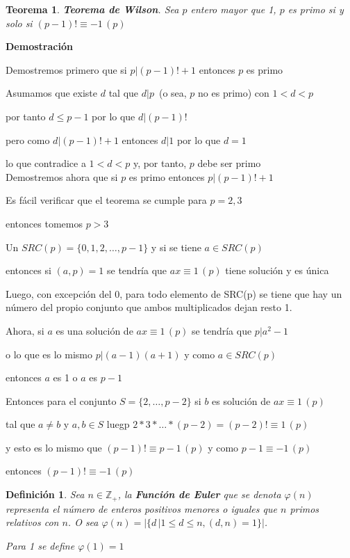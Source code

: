 \documentclass[a4paper,12pt]{report}
\newtheorem*{teo}{Teorema}
\newtheorem*{dfn}{Definición}
\begin{document}
 
 
 \begin{teo}
  \textbf{Teorema de Wilson}. Sea $p$ entero mayor que 1, $p$ es primo si y solo si $(p-1)!\equiv -1\, (p)$
 \end{teo}
 
 \textbf{Demostración}
 
 Demostremos primero que si $p|(p-1)! + 1$ entonces $p$ es primo
 
 Asumamos que existe $d$ tal que $d|p$~(o sea, $p$ no es primo) con $1<d<p$
 
 por tanto $d\leq p-1$ por lo que $d|(p-1)!$
 
 pero como $d|(p-1)!+1$ entonces $d|1$ por lo que $d=1$ 
 
 lo que contradice a $1<d<p$ y, por tanto, $p$ debe ser primo\\
 
 Demostremos ahora que si $p$ es primo entonces $p|(p-1)! + 1$
 
 Es fácil verificar que el teorema se cumple para $p=2,3$ 
 
 entonces tomemos $p>3$
 
 Un $SRC(p)=\{0,1,2,\dots,p-1\}$ y si se tiene $a\in SRC(p)$ 
 
 entonces si $(a,p)=1$  se tendría que $ax\equiv 1\, (p)$ tiene solución y es única
 
 Luego, con excepción del 0, para todo elemento de SRC(p) se tiene que hay un número del propio 
 conjunto que ambos multiplicados dejan resto 1.
 
 Ahora, si $a$ es una solución de $ax\equiv 1\, (p)$ se tendría que $p|a^2-1$ 
 
 o lo que es lo mismo $p|(a-1)(a+1)$ y como $a\in SRC(p)$  
 
 entonces $a$ es 1 o $a$ es $p-1$
 
 Entonces para el conjunto $S=\{2,\dots,p-2\}$ si $b$ es solución de $ax\equiv 1\, (p)$
 
 tal que $a\neq b$ y $a,b\in S$ luegp $2*3*\dots * (p-2)=(p-2)!\equiv 1 \, (p)$
 
 y esto es lo mismo que $(p-1)!\equiv p-1 \, (p)$ y como $p-1\equiv -1 \, (p)$
 
 entonces $(p-1)!\equiv -1 \, (p)$
 
 \begin{dfn}
  Sea $n\in \mathbb{Z}_+$, la \textbf{Función de Euler} que se denota $\varphi(n)$ representa el número de enteros positivos menores o iguales que $n$ primos relativos con $n$. O sea $\varphi(n)=|\{d\, |1\leq d \leq n,(d,n)=1\}|$. 
  
  Para 1 se define $\varphi(1)=1$
 \end{dfn}
 
\end{document}
